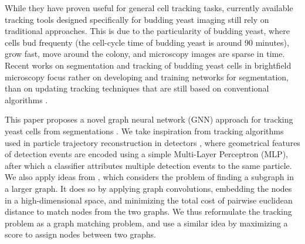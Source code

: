 \documentclass[10pt,conference,compsocconf,a4paper]{IEEEtran}
\begin{document}
    While they have proven useful for general cell tracking tasks, currently available tracking tools designed specifically for budding yeast imaging still rely on traditional approaches. 
	This is due to the particularity of budding yeast, where cells bud frequenty (the cell-cycle time of budding yeast is around 90 minutes), grow fast, move around the colony, and microscopy images are sparse in time. 
	Recent works on segmentation and tracking of budding yeast cells in brightfield microscopy focus rather on developing and training networks for segmentation, than on updating tracking techniques that are still based on conventional algorithms \cite{dietler_convolutional_2020,yeastnet,kruitbosch}.

    This paper proposes a novel graph neural network (GNN) approach for tracking yeast cells from segmentations \cite{dietler_convolutional_2020, Stringer2020.02.02.931238}. 
	We take inspiration from tracking algorithms used in particle trajectory reconstruction in detectors \cite{dezoort_charged_2021}, where geometrical features of detection events are encoded using a simple Multi-Layer Perceptron (MLP), after which a classifier attributes multiple detection events to the same particle. We also apply ideas from \cite{kipf_semi-supervised_2017}, which considers the problem of finding a subgraph in a larger graph. It does so by applying graph convolutions, embedding the nodes in a high-dimensional space, and minimizing the total cost of pairwise euclidean distance to match nodes from the two graphs.
	We thus reformulate the tracking problem as a graph matching problem, and use a similar idea by maximizing a score to assign nodes between two graphs.


\end{document}
